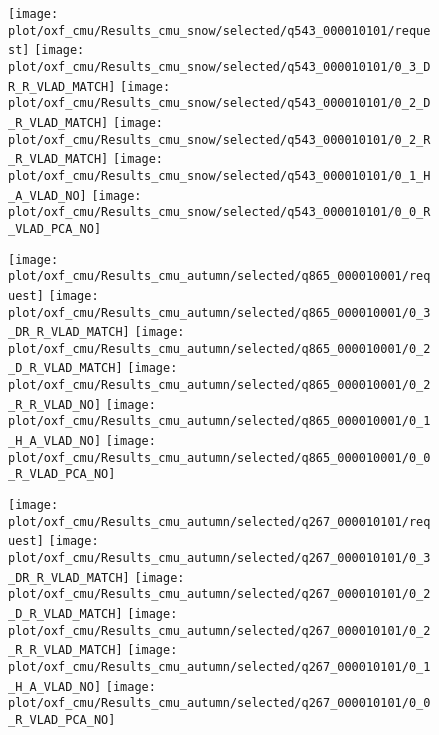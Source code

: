 \begin{figure}
\begin{minipage}{0.95\textwidth}
		\texttt{[image: plot/oxf\_cmu/Results\_cmu\_snow/selected/q543\_000010101/request]}
		\texttt{[image: plot/oxf\_cmu/Results\_cmu\_snow/selected/q543\_000010101/0\_3\_DR\_R\_VLAD\_MATCH]}
		\texttt{[image: plot/oxf\_cmu/Results\_cmu\_snow/selected/q543\_000010101/0\_2\_D\_R\_VLAD\_MATCH]}
		\texttt{[image: plot/oxf\_cmu/Results\_cmu\_snow/selected/q543\_000010101/0\_2\_R\_R\_VLAD\_MATCH]}
		\texttt{[image: plot/oxf\_cmu/Results\_cmu\_snow/selected/q543\_000010101/0\_1\_H\_A\_VLAD\_NO]}
		\texttt{[image: plot/oxf\_cmu/Results\_cmu\_snow/selected/q543\_000010101/0\_0\_R\_VLAD\_PCA\_NO]}
	\end{minipage}
	
	\begin{minipage}{0.01\textwidth}
	\end{minipage}
	\begin{minipage}{0.95\textwidth}
		\center
		\texttt{[image: plot/oxf\_cmu/Results\_cmu\_autumn/selected/q865\_000010001/request]}
		\texttt{[image: plot/oxf\_cmu/Results\_cmu\_autumn/selected/q865\_000010001/0\_3\_DR\_R\_VLAD\_MATCH]}
		\texttt{[image: plot/oxf\_cmu/Results\_cmu\_autumn/selected/q865\_000010001/0\_2\_D\_R\_VLAD\_MATCH]}	
		\texttt{[image: plot/oxf\_cmu/Results\_cmu\_autumn/selected/q865\_000010001/0\_2\_R\_R\_VLAD\_NO]}	
		\texttt{[image: plot/oxf\_cmu/Results\_cmu\_autumn/selected/q865\_000010001/0\_1\_H\_A\_VLAD\_NO]}	
		\texttt{[image: plot/oxf\_cmu/Results\_cmu\_autumn/selected/q865\_000010001/0\_0\_R\_VLAD\_PCA\_NO]}
		
		\texttt{[image: plot/oxf\_cmu/Results\_cmu\_autumn/selected/q267\_000010101/request]}
		\texttt{[image: plot/oxf\_cmu/Results\_cmu\_autumn/selected/q267\_000010101/0\_3\_DR\_R\_VLAD\_MATCH]}
		\texttt{[image: plot/oxf\_cmu/Results\_cmu\_autumn/selected/q267\_000010101/0\_2\_D\_R\_VLAD\_MATCH]}
		\texttt{[image: plot/oxf\_cmu/Results\_cmu\_autumn/selected/q267\_000010101/0\_2\_R\_R\_VLAD\_MATCH]}
		\texttt{[image: plot/oxf\_cmu/Results\_cmu\_autumn/selected/q267\_000010101/0\_1\_H\_A\_VLAD\_NO]}
		\texttt{[image: plot/oxf\_cmu/Results\_cmu\_autumn/selected/q267\_000010101/0\_0\_R\_VLAD\_PCA\_NO]}
	\end{minipage}
	

\end{figure}
